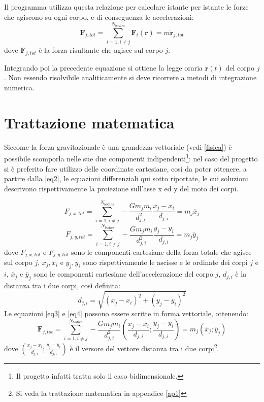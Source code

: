 \documentclass{article}
\begin{document}
Il programma utilizza questa relazione per calcolare istante per istante le forze che agiscono su ogni corpo, e di conseguenza le accelerazioni:
\begin{equation}
    \textbf{F}_{j,tot}=\sum_{i=1, i\neq j}^{N_{bodies}}\textbf{F}_{i}(\textbf{r})=m\ddot{\textbf{r}}_{j,tot}
    \label{eq2}
\end{equation}
dove $\textbf{F}_{j,tot}$ è la forza risultante che agisce sul corpo $j$.

Integrando poi la precedente equazione si ottiene la legge oraria $\textbf{r}(t)$ del corpo $j$. Non essendo risolvibile analiticamente si deve ricorrere a metodi di integrazione numerica.

\section{Trattazione matematica}
Siccome la forza gravitazionale è una grandezza vettoriale (vedi \ref{fisica}) è possibile scomporla nelle sue due componenti indipendenti\footnote{Il progetto infatti tratta solo il caso bidimensionale.}: nel caso del progetto si è preferito fare utilizzo delle coordinate cartesiane, così da poter ottenere, a partire dalla \ref{eq2}, le equazioni differenziali qui sotto riportate, le cui soluzioni descrivono rispettivamente la proiezione sull'asse x ed y del moto dei corpi.

\begin{equation}
    F_{j,x,tot}=\sum_{i=1,i\neq j}^{N_{bodies}}-\frac{Gm_{j}m_{i}}{d_{j,i}^2}\frac{x_{j}-x_{i}}{d_{j,i}}=m_{j}\ddot{x_{j}}
    \label{eq3}
\end{equation}
\begin{equation}
    F_{j,y,tot}=\sum_{i=1,i\neq j}^{N_{bodies}}-\frac{Gm_{j}m_{i}}{d_{j,i}^2}\frac{y_{j}-y_{i}}{d_{j,i}}=m_{j}\ddot{y_{j}}
\label{eq4}
\end{equation}
dove $F_{j,x,tot}$ e $F_{j,y,tot}$ sono le componenti cartesiane della forza totale che agisce sul corpo $j$, $x_{j}, x_{i}$ e $y_{j}, y_{i}$ sono rispettivamente le ascisse e le ordinate dei corpi $j$ e $i$, $\ddot{x_{j}}$ e $\ddot{y_{j}}$ sono le componenti cartesiane dell'accelerazione del corpo $j$, $d_{j,i}$ è la distanza tra i due corpi, così definita:
\begin{equation}
    d_{j,i}=\sqrt{(x_{j}-x_{i})^2+(y_{j}-y_{i})^2}
\end{equation}
Le equazioni \ref{eq3} e \ref{eq4} possono essere scritte in forma vettoriale, ottenendo:
\begin{equation}
    \textbf{F}_{j,tot}=\sum_{i=1,i\neq j}^{N_{bodies}}-\frac{Gm_{j}m_{i}}{d_{j,i}^2}(\frac{x_{j}-x_{i}}{d_{j,i}}; \frac{y_{j}-y_{i}}{d_{j,i}})=m_{j}(\ddot{x_{j}}; \ddot{y_{j}})
\label{eq5}
\end{equation}
dove $(\frac{x_{j}-x_{i}}{d_{j,i}}; \frac{y_{j}-y_{i}}{d_{j,i}})$ è il versore del vettore distanza tra i due corpi\footnote{Si veda la trattazione matematica in appendice \ref{ap1}}.
\end{document}
